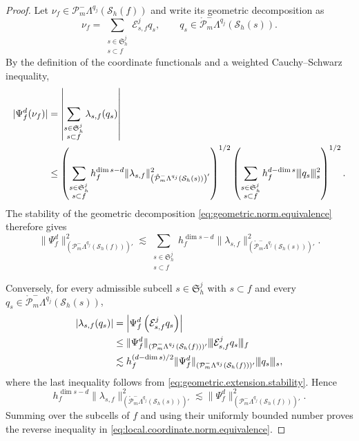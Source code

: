 \documentclass[a4paper,11pt]{article}
\theoremstyle{definition}
\newcommand{\Sh}{\mathcal{S}_h}
\newcommand{\PLtrim}[2]{\mathcal{P}_{#1}^{-}\Lambda^{#2}}
\newcommand{\PLtrimz}[2]{\mathring{\mathcal P}_{#1}^{-}\Lambda^{#2}}
\newcommand{\vvvert}{\vert\kern-0.25ex\vert\kern-0.25ex\vert}
\begin{document}
\begin{proof}
Let $\nu_f\in\PLtrim{m}{q_j}(\Sh(f))$ and write its geometric decomposition as
\[
\nu_f
=
\sum_{\substack{
s\in\mathfrak S_h^j\\
s\subset f
}}
\mathcal E_{s,f}^jq_s,
\qquad
q_s\in\PLtrimz{m}{q_j}(\Sh(s)).
\]
By the definition of the coordinate functionals and a weighted Cauchy--Schwarz inequality,
\[
\begin{aligned}
|\Psi_f^d(\nu_f)|
&=
\left|
\sum_{\substack{
s\in\mathfrak S_h^j\\
s\subset f
}}
\lambda_{s,f}(q_s)
\right|
\\
&\le
\left(
\sum_{\substack{
s\in\mathfrak S_h^j\\
s\subset f
}}
h_f^{\dim s-d}
\|\lambda_{s,f}\|_
{\left(\PLtrimz{m}{q_j}(\Sh(s))\right)'}^2
\right)^{1/2}
\left(
\sum_{\substack{
s\in\mathfrak S_h^j\\
s\subset f
}}
h_f^{d-\dim s}
\vvvert q_s\vvvert_s^2
\right)^{1/2}.
\end{aligned}
\]
The stability of the geometric decomposition \eqref{eq:geometric.norm.equivalence} therefore gives
\[
\|\Psi_f^d\|_{(\PLtrim{m}{q_j}(\Sh(f)))'}^2
\lesssim
\sum_{\substack{
s\in\mathfrak S_h^j\\
s\subset f
}}
h_f^{\dim s-d}
\|\lambda_{s,f}\|_
{\left(\PLtrimz{m}{q_j}(\Sh(s))\right)'}^2.
\]

Conversely, for every admissible subcell $s\in\mathfrak S_h^j$ with $s\subset f$ and every $q_s\in\PLtrimz{m}{q_j}(\Sh(s))$,
\[
\begin{aligned}
|\lambda_{s,f}(q_s)|
&=
\left|
\Psi_f^d
\left(
\mathcal E_{s,f}^jq_s
\right)
\right|
\\
&\le
\|\Psi_f^d\|_{(\PLtrim{m}{q_j}(\Sh(f)))'}
\vvvert
\mathcal E_{s,f}^jq_s
\vvvert_f
\\
&\lesssim
h_f^{(d-\dim s)/2}
\|\Psi_f^d\|_{(\PLtrim{m}{q_j}(\Sh(f)))'}
\vvvert q_s\vvvert_s,
\end{aligned}
\]
where the last inequality follows from \eqref{eq:geometric.extension.stability}.
Hence
\[
h_f^{\dim s-d}
\|\lambda_{s,f}\|_
{\left(\PLtrimz{m}{q_j}(\Sh(s))\right)'}^2
\lesssim
\|\Psi_f^d\|_{(\PLtrim{m}{q_j}(\Sh(f)))'}^2.
\]
Summing over the subcells of $f$ and using their uniformly bounded number proves the reverse inequality in \eqref{eq:local.coordinate.norm.equivalence}.


\end{proof}
\end{document}
